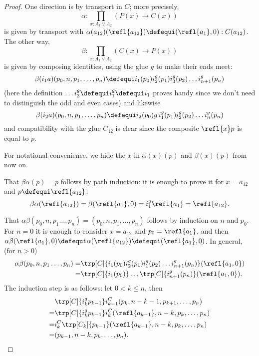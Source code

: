 \begin{proof}
One direction is by transport in $C$; more precisely,
$$\alpha:\prod_{x:A_1\vee A_2}(P(x)\to C(x))$$ is given by transport with $\alpha(a_{12})(\refl{a_{12}})\defequi(\refl{a_{1}},0):C(a_{12})$.
The other way,
$$\beta:\prod_{x:A_1\vee A_2}(C(x)\to P(x))$$ is given by composing identities, using the glue $g$ to make their ends meet:
$$\beta(i_1a)(p_0,n,p_1,\dots,p_n)\defequi i_1(p_0)i_2^g(p_1)i_3^g(p_2) \dots i_{n+1}^g(p_n)$$
(here the definition $\dots i_3^g\defequi i_1^g\defequi i_1$ proves handy since we don't need to distinguish the odd and even cases)
and likewise
$$\beta(i_2a)(p_0,n,p_1,\dots,p_n)\defequi i_2(p_0)g\,i_1^g(p_1)i_2^g(p_2) \dots i_{n}^g(p_n)$$ and compatibility with the glue $C_{12}$ is clear since the composite $\refl{x}p$ is equal to $p$.

For notational convenience, we hide the $x$ in $\alpha(x)(p)$ and $\beta(x)(p)$ from now on.

That $\beta\alpha(p)=p$ follows by path induction: it is enough to prove it for $x=a_{12}$ and
$p\defequi\refl{a_{12}}$:
$$\beta\alpha(\refl{a_{12}})=\beta(\refl{a_1},0)=i_1^g\refl{a_1}=\refl{a_{12}}.$$

That $\alpha\beta(p_0,n,p_1\dots,p_n)=(p_0,n,p_1,\dots,p_n)$ follows by induction on $n$ and $p_0$.  For $n=0$ it is enough to consider  $x=a_{12}$ and $p_0=\refl{a_1}$, and then
$\alpha\beta(\refl{a_1},0)\defequi\alpha(\refl{a_{12}})\defequi(\refl{a_1},0)$.  In general, (for $n>0$)
\begin{align*}
  \alpha\beta(p_0,n,p_1\dots,p_n)
=&\trp[C]{i_1(p_0)i_2^g(p_1)i_1^g(p_2) \dots i_{n+1}^g(p_n)}(\refl{a_1,0})\\
=&\trp[C]{i_1(p_0)}\dots\trp[C]{i_{n+1}^g(p_n)}(\refl{a_1,0}).
\end{align*}
  The induction step is as follows: let $0< k\leq n$, then
\begin{align*}
  &\trp[C]{i_k^gp_{k-1}}i^C_{k-1}(p_k,n-k-1,p_{k+1},\dots,p_n)\\
  =&\trp[C]{i_k^gp_{k-1}}i^C_k(\refl{a_{k-1}},n-k,p_k,\dots,p_n)\\
  =&i^C_k\trp[C_k]{p_{k-1}}(\refl{a_{k-1}},n-k,p_k,\dots,p_n)\\
  =&(p_{k-1},n-k,p_k,\dots,p_n).
\end{align*}
\end{proof}

